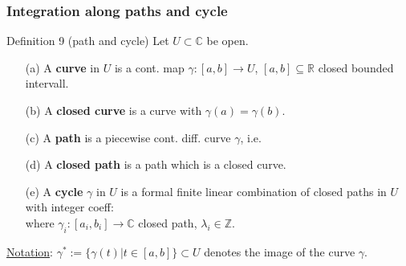 \documentclass[10pt]{beamer}
\newcommand{\R}{\mathbb{R}}
\newcommand{\C}{\mathbb{C}}
\newcommand{\Z}{\mathbb{Z}}
\begin{document}
{\begin{frame}
\begin{itemize}
\end{itemize}
\end{frame}

\begin{frame} \frametitle{Integration along paths and cycle}
\begin{alertblock}{Definition 9 (path and cycle)}
Let $U\subset \C$ be open.
\begin{itemize}
\item[(a)] A \textbf{curve} in $U$ is a cont. map $\gamma:[a,b] \rightarrow U$, $[a,b] \subseteq \R$ closed bounded intervall.
\item[(b)] A \textbf{closed curve} is a curve with $\gamma(a)=\gamma(b)$. 
\item[(c)] A \textbf{path} is a piecewise cont. diff. curve $\gamma$, i.e.\\
\vspace{0.7cm}
\item[(d)] A \textbf{closed path} is a path which is a closed curve.
\item[(e)] A \textbf{cycle} $\gamma$ in $U$ is a formal finite linear combination of closed paths in $U$ with integer coeff:\\
\vspace{0.7cm}
where $\gamma_i:[a_i,b_i] \rightarrow \C$ closed path, $\lambda_i\in \Z$.
\end{itemize}
\end{alertblock}
\underline{Notation}: $\gamma^*:=\{\gamma(t)|t \in [a,b]\} \subset U$ denotes the image of the curve $\gamma$.
\end{frame}

}
\end{document}
